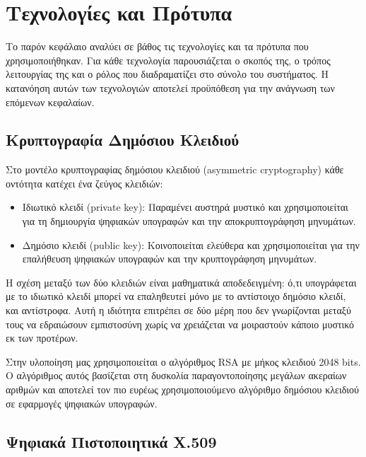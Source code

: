 \chapter{Τεχνολογίες και Πρότυπα}
\label{ch:technologies}

Το παρόν κεφάλαιο αναλύει σε βάθος τις τεχνολογίες και τα πρότυπα που χρησιμοποιήθηκαν. 
Για κάθε τεχνολογία παρουσιάζεται ο σκοπός της, ο τρόπος λειτουργίας της και ο ρόλος που διαδραματίζει στο σύνολο
του συστήματος. Η κατανόηση αυτών των τεχνολογιών αποτελεί προϋπόθεση για την
ανάγνωση των επόμενων κεφαλαίων.

\section{Κρυπτογραφία Δημόσιου Κλειδιού}
\label{sec:public-key-crypto}

Στο μοντέλο κρυπτογραφίας δημόσιου κλειδιού (\textlatin{asymmetric cryptography})
κάθε οντότητα κατέχει ένα ζεύγος κλειδιών:

\begin{itemize}
    \item Ιδιωτικό κλειδί (\textlatin{private key}): Παραμένει
    αυστηρά μυστικό και χρησιμοποιείται για τη δημιουργία ψηφιακών υπογραφών
    και την αποκρυπτογράφηση μηνυμάτων.
    \item Δημόσιο κλειδί (\textlatin{public key}): Κοινοποιείται
    ελεύθερα και χρησιμοποιείται για την επαλήθευση ψηφιακών υπογραφών και
    την κρυπτογράφηση μηνυμάτων.
\end{itemize}

Η σχέση μεταξύ των δύο κλειδιών είναι μαθηματικά αποδεδειγμένη: ό,τι υπογράφεται
με το ιδιωτικό κλειδί μπορεί να επαληθευτεί μόνο με το αντίστοιχο δημόσιο
κλειδί, και αντίστροφα. Αυτή η ιδιότητα επιτρέπει σε δύο μέρη που δεν
γνωρίζονται μεταξύ τους να εδραιώσουν εμπιστοσύνη χωρίς να χρειάζεται να
μοιραστούν κάποιο μυστικό εκ των προτέρων.

Στην  υλοποίηση μας χρησιμοποιείται ο αλγόριθμος \textlatin{RSA} με
μήκος κλειδιού 2048 \textlatin{bits}. Ο αλγόριθμος αυτός βασίζεται στη
δυσκολία παραγοντοποίησης μεγάλων ακεραίων αριθμών και αποτελεί τον πιο
ευρέως χρησιμοποιούμενο αλγόριθμο δημόσιου κλειδιού σε εφαρμογές ψηφιακών
υπογραφών.

\section{Ψηφιακά Πιστοποιητικά \textlatin{X.509 }  }
\label{sec:x509}

